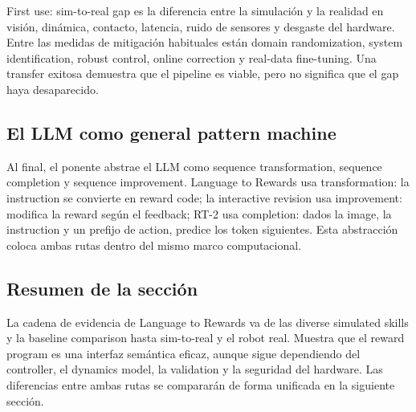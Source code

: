 \begin{warningbox}{First use: sim-to-real gap}
 es la diferencia entre la simulación y la realidad en visión, dinámica, contacto, latencia, ruido de sensores y desgaste del hardware. Entre las medidas de mitigación habituales están domain randomization, system identification, robust control, online correction y real-data fine-tuning. Una transfer exitosa demuestra que el pipeline es viable, pero no significa que el gap haya desaparecido.
\end{warningbox}

\subsection{El LLM como general pattern machine}

Al final, el ponente abstrae el LLM como sequence transformation, sequence completion y sequence improvement. Language to Rewards usa transformation: la instruction se convierte en reward code; la interactive revision usa improvement: modifica la reward según el feedback; RT-2 usa completion: dados la image, la instruction y un prefijo de action, predice los token siguientes. Esta abstracción coloca ambas rutas dentro del mismo marco computacional.




\subsection{Resumen de la sección}

La cadena de evidencia de Language to Rewards va de las diverse simulated skills y la baseline comparison hasta sim-to-real y el robot real. Muestra que el reward program es una interfaz semántica eficaz, aunque sigue dependiendo del controller, el dynamics model, la validation y la seguridad del hardware. Las diferencias entre ambas rutas se compararán de forma unificada en la siguiente sección.
